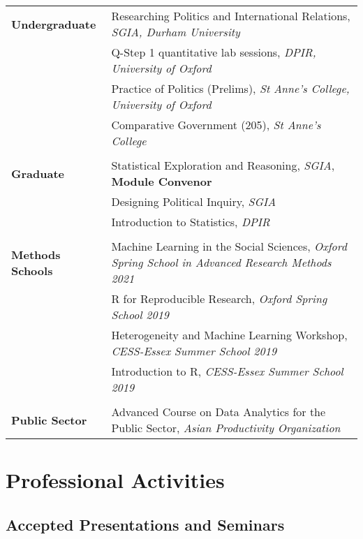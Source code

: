 \documentclass[11pt, a4paper]{article}
\begin{document}
  \begin{tabular}{p{}|p{}}
     \textbf{Undergraduate} 
      & Researching Politics and International Relations, \textit{SGIA, Durham University}\\
      & Q-Step 1 quantitative lab sessions, \textit{DPIR, University of Oxford} \\
      & Practice of Politics (Prelims), \textit{St Anne's College, University of Oxford}\\
      & Comparative Government (205), \textit{St Anne's College} \\
      & \\
      \textbf{Graduate} 
      & Statistical Exploration and Reasoning, \textit{SGIA}, \textbf{Module Convenor} \\
      & Designing Political Inquiry, \textit{SGIA} \\
      &  Introduction to Statistics, \textit{DPIR} \\
      & \\
      \textbf{Methods Schools} & Machine Learning in the Social Sciences, \textit{Oxford Spring School in Advanced Research Methods 2021} \\
      & R for Reproducible Research, \textit{Oxford Spring School 2019} \\
      & Heterogeneity and Machine Learning Workshop, \textit{CESS-Essex Summer School 2019} \\
      & Introduction to R, \textit{CESS-Essex Summer School 2019} \\
      & \\
      \textbf{Public Sector} 
      & Advanced Course on Data Analytics for the Public Sector, \textit{Asian Productivity Organization} \\
 \end{tabular}

 \section*{Professional Activities}

 \subsection*{Accepted Presentations and Seminars}
\end{document}
